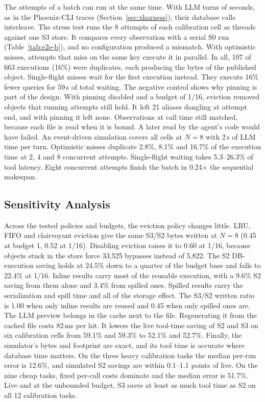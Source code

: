 The attempts of a batch can run at the same time. With LLM turns of seconds, as in the Phoenix-CLI traces
(Section~\ref{sec:xharness}), their database calls interleave. The stress test runs the 8 attempts of each
calibration cell as threads against one S3 store. It compares every observation with a serial S0 run
(Table~\ref{tab:e2e-b}), and no configuration produced a mismatch. With optimistic misses, attempts that miss on the
same key execute it in parallel. In all, 107 of 663 executions (16\%) were duplicates, each producing the bytes of
the published object. Single-flight misses wait for the first execution instead. They execute 16\% fewer queries
for 59\,s of total waiting. The negative control shows why pinning is part of the design. With pinning disabled and
a budget of 1/16, eviction removed objects that running attempts still held. It left 21 aliases dangling at attempt
end, and with pinning it left none. Observations at call time still matched, because each file is read when it is
bound. A later read by the agent's code would have failed. An event-driven simulation covers all cells at $N=8$ with
2\,s of LLM time per turn. Optimistic misses duplicate 2.8\%, 8.1\% and 16.7\% of the execution time at 2, 4 and 8
concurrent attempts. Single-flight waiting takes 5.3--26.3\% of tool latency. Eight concurrent attempts finish the
batch in 0.24$\times$ the sequential makespan.

\subsection{Sensitivity Analysis}
\label{sec:sensitivity}

Across the tested policies and budgets, the eviction policy changes little. LRU, FIFO and clairvoyant eviction give
the same S3/S2 bytes written at $N=8$ (0.45 at budget 1, 0.52 at 1/16). Disabling eviction raises it to 0.60 at 1/16,
because objects stuck in the store force 33,525 bypasses instead of 5,822. The S2 DB-execution saving holds at
24.5\% down to a quarter of the budget base and falls to 22.4\% at 1/16. Inline results carry most of the reusable
execution, with a 9.6\% S2 saving from them alone and 3.4\% from spilled ones. Spilled results carry the
serialization and spill time and all of the storage effect. The S3/S2 written ratio is 1.00 when only inline results
are reused and 0.45 when only spilled ones are. The LLM preview belongs in the cache next to the file. Regenerating
it from the cached file costs 82\,ms per hit. It lowers the live tool-time saving of S2 and S3 on six calibration
cells from 59.1\% and 59.3\% to 52.1\% and 52.7\%. Finally, the simulator's bytes and footprint are exact, and its
tool time is accurate where database time matters. On the three heavy calibration tasks the median per-run error is
12.6\%, and simulated S2 savings are within 0.1--1.1 points of live. On the nine cheap tasks, fixed per-call costs dominate and the median error is 51.7\%. Live and at the unbounded budget, S3 saves at least as much tool time as S2 on all 12 calibration tasks.
